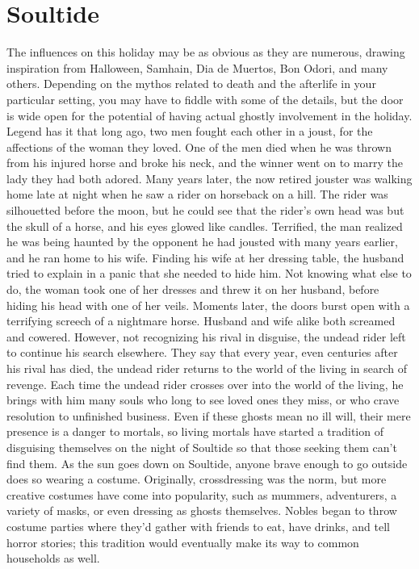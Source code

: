 \documentclass[10pt,a4paper,twoside,twocolumn,openany,bg=print,nodeprecatedcode]{dndbook}
\begin{document}
\section{Soultide}
The influences on this holiday may be as obvious as they are numerous, drawing inspiration from Halloween, Samhain, Dia de Muertos, Bon Odori, and many others. Depending on the mythos related to death and the afterlife in your particular setting, you may have to fiddle with some of the details, but the door is wide open for the potential of having actual ghostly involvement in the holiday.
Legend has it that long ago, two men fought each other in a joust, for the affections of the woman they loved. One of the men died when he was thrown from his injured horse and broke his neck, and the winner went on to marry the lady they had both adored. Many years later, the now retired jouster was walking home late at night when he saw a rider on horseback on a hill. The rider was silhouetted before the moon, but he could see that the rider's own head was but the skull of a horse, and his eyes glowed like candles.
Terrified, the man realized he was being haunted by the opponent he had jousted with many years earlier, and he ran home to his wife. Finding his wife at her dressing table, the husband tried to explain in a panic that she needed to hide him. Not knowing what else to do, the woman took one of her dresses and threw it on her husband, before hiding his head with one of her veils. Moments later, the doors burst open with a terrifying screech of a nightmare horse. Husband and wife alike both screamed and cowered. However, not recognizing his rival in disguise, the undead rider left to continue his search elsewhere. They say that every year, even centuries after his rival has died, the undead rider returns to the world of the living in search of revenge. Each time the undead rider crosses over into the world of the living, he brings with him many souls who long to see loved ones they miss, or who crave resolution to unfinished business. Even if these ghosts mean no ill will, their mere presence is a danger to mortals, so living mortals have started a tradition of disguising themselves on the night of Soultide so that those seeking them can't find them.
As the sun goes down on Soultide, anyone brave enough to go outside does so wearing a costume. Originally, crossdressing was the norm, but more creative costumes have come into popularity, such as mummers, adventurers, a variety of masks, or even dressing as ghosts themselves. Nobles began to throw costume parties where they'd gather with friends to eat, have drinks, and tell horror stories; this tradition would eventually make its way to common households as well.
\end{document}
